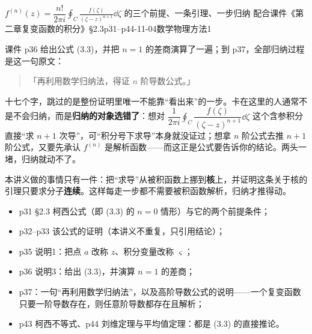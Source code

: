 \documentclass[11pt]{ctexart}
\let\origsubhdr\subhdr
\renewcommand{\subhdr}[1]{\par\origsubhdr{#1}}
\begin{document}
{$f^{(n)}(z)=\dfrac{n!}{2\pi i}\displaystyle\oint_C\frac{f(\zeta)}{(\zeta-z)^{n+1}}\dd\zeta$ 的三个前提、一条引理、一步归纳}
{配合课件《第二章\quad 复变函数的积分》§2.3\quad p31--p44-11-04\quad 数学物理方法1}


课件 p36 给出公式 (3.3)，并把 $n=1$ 的差商演算了一遍；到 p37，全部归纳过程是这一句原文：

\begin{quote}
「再利用数学归纳法，得证 $n$ 阶导数公式。」
\end{quote}

十七个字，跳过的是整份证明里唯一不能靠“看出来”的一步。卡在这里的人通常不是不会归纳，而是\textbf{归纳的对象选错了}：想对 $\dfrac{1}{2\pi i}\displaystyle\oint_C\dfrac{f(\zeta)}{(\zeta-z)^{n+1}}\dd\zeta$ 这个含参积分直接“求 $n+1$ 次导”，可“积分号下求导”本身就没证过；想拿 $n$ 阶公式去推 $n+1$ 阶公式，又要先承认 $f^{(n)}$ 是解析函数——而这正是公式要告诉你的结论。两头一堵，归纳就动不了。

本讲义做的事情只有一件：把“求导”从被积函数上挪到\textbf{核}上，并证明这条关于核的引理只要求分子\textbf{连续}。这样每走一步都不需要被积函数解析，归纳才推得动。


\begin{itemize}[leftmargin=1.6em]
\item p31 §2.3 柯西公式（即 (3.3) 的 $n=0$ 情形）与它的两个前提条件；
\item p32--p33 该公式的证明（本讲义不重复，只引用结论）；
\item p35 说明1：把点 $a$ 改称 $z$、积分变量改称 $\varsigma$；
\item p36 说明3：给出 (3.3)，并演算 $n=1$ 的差商；
\item p37：一句“再利用数学归纳法”，以及高阶导数公式的说明——一个复变函数只要一阶导数存在，则任意阶导数都存在且解析；
\item p43 柯西不等式、p44 刘维定理与平均值定理：都是 (3.3) 的直接推论。
\end{itemize}


\end{document}

